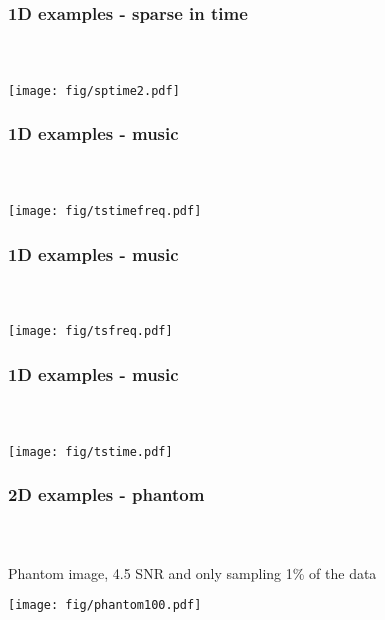 \documentclass[mathserif,18pt,xcolor=table]{beamer}
\begin{document}
\begin{frame}[t]
\frametitle{1D examples - sparse in time}
\framesubtitle{~~}  %

\centering
\texttt{[image: fig/sptime2.pdf]}

\end{frame}




\begin{frame}[t]
\frametitle{1D examples - music}
\framesubtitle{~~}  %


\centering
\texttt{[image: fig/tstimefreq.pdf]}

\end{frame}


\begin{frame}[t]
\frametitle{1D examples - music}
\framesubtitle{~~}  %


\centering
\texttt{[image: fig/tsfreq.pdf]}

\end{frame}


\begin{frame}[t]
\frametitle{1D examples - music}
\framesubtitle{~~}  %


\centering
\texttt{[image: fig/tstime.pdf]}

\end{frame}


\begin{frame}[t]
\frametitle{2D examples - phantom}
\framesubtitle{~~}  %

Phantom image, 4.5 SNR and only sampling 1\% of the data

\centering
\texttt{[image: fig/phantom100.pdf]}

\end{frame}
\end{document}
